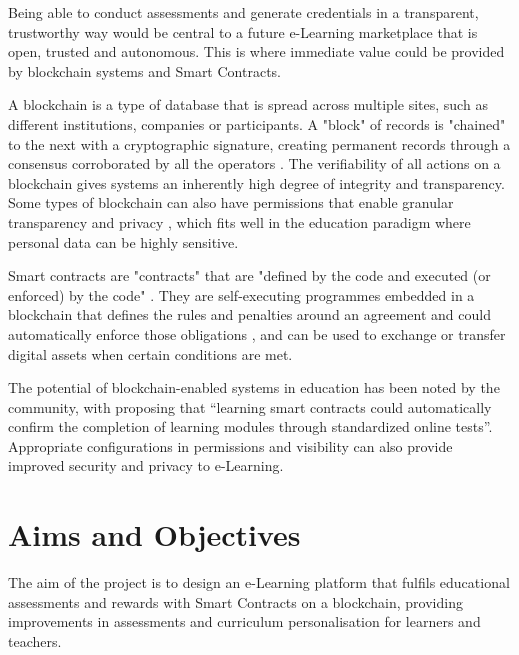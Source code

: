 Being able to conduct assessments and generate credentials in a transparent, trustworthy way would be central to 
a future e-Learning marketplace that is open, trusted and autonomous.
This is where immediate value could be provided by blockchain systems and Smart Contracts.

A blockchain is a type of database that is spread across multiple sites, such as different institutions, companies 
or participants. A "block" of records is "chained" to the next with a cryptographic signature, creating permanent records 
through a consensus corroborated by all the operators \citep[p.17]{walport2016distributed}.
The verifiability of all actions on a blockchain gives systems an inherently high degree of integrity and transparency. 
Some types of blockchain can also have permissions that enable granular transparency and privacy \citep[p.22]{walport2016distributed}, 
which fits well in the education paradigm where personal data can be highly sensitive.

Smart contracts are "contracts" that are "defined by the code and executed (or enforced) by the code" \citep[p.16]{swan2015blockchain}.
They are self-executing programmes embedded in a blockchain that defines the rules and penalties around an agreement and could automatically enforce 
those obligations \citep{gulhane2017ibm}, and can be used to exchange or transfer digital assets when certain conditions are met. 

The potential of blockchain-enabled systems in education has been noted by the community, with \citet[p.62]{swan2015blockchain} 
proposing that “learning smart contracts could automatically confirm the completion of learning modules through standardized 
online tests”. Appropriate configurations in permissions and visibility can also provide improved security and privacy to e-Learning.

\section{Aims and Objectives} %

The aim of the project is to design an e-Learning platform that fulfils educational assessments and 
rewards with Smart Contracts on a blockchain, providing improvements in assessments and curriculum 
personalisation for learners and teachers.

